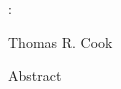 %
%

\title{\mytitle}
\graphicspath{{../Graphics/}}


\thispagestyle{empty}
{ \phantom{.} \vspace*{\fill}}
\begin{center}
	{\Large\scshape \mytitle:}\\
        {\large\scshape \mysubtitle}
	
	Thomas R. Cook
	
	{\mydate}
\end{center}
\vspace*{\fill}
\clearpage
\thispagestyle{empty}
{ \phantom{.} \vspace*{\fill}}
\begin{center}
{\Large Abstract}
\end{center}
\label{abstract}
\singlespacing
\myabstract






\vspace*{\fill}
\clearpage
\pagestyle{empty}

\tableofcontents

\cleardoublepage

\thispagestyle{fancy}
\pagestyle{fancy}